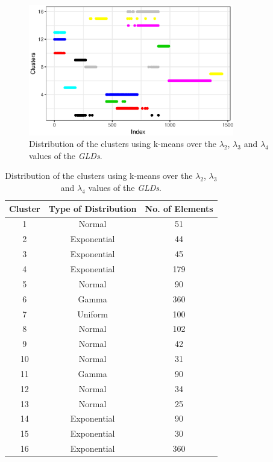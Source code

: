 \begin{figure}[H]
    \centering
    \includegraphics[width=0.8\textwidth]{img/gld_clustering/datasetII/l2l3l4/normal_exponential_uniform3.eps}
    \caption{Distribution of the clusters using k-means over the $\lambda_{2}$, $\lambda_{3}$ and $\lambda_{4}$ values of the \textit{GLDs}.}
    \label{fig:dataset2_l2l3l4}
\end{figure}

\begin{table}[]
\centering
\caption{Distribution of the clusters using k-means over the $\lambda_{2}$, $\lambda_{3}$ and $\lambda_{4}$ values of the \textit{GLDs}.}
\label{tab:dataset2_l2l3l4}
\begin{tabular}{|c|c|c|}
\hline
Cluster & Type of Distribution & No. of Elements \\ \hline
1       & Normal          & 51              \\ \hline
2       & Exponential          & 44              \\ \hline
3       & Exponential          & 45             \\ \hline
4       & Exponential               & 179              \\ \hline
5       & Normal               & 90             \\ \hline
6       & Gamma               & 360            \\ \hline
7       & Uniform              & 100            \\ \hline
8       & Normal          & 102              \\ \hline
9       & Normal          & 42               \\ \hline
10      & Normal               & 31              \\ \hline
11      & Gamma          & 90              \\ \hline
12       & Normal              & 34             \\ \hline
13       & Normal          & 25              \\ \hline
14       & Exponential          & 90              \\ \hline
15      & Exponential               & 30              \\ \hline
16      & Exponential          & 360              \\ \hline
\end{tabular}
\end{table}


